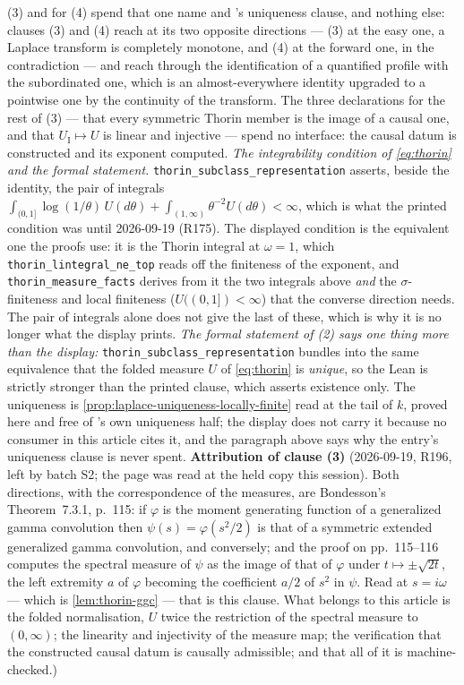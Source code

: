 \begin{proposition}
{(3) and for (4) spend that one name and 's uniqueness clause, and nothing else:
clauses (3) and (4) reach  at its two opposite directions --- (3) at the easy one, a
Laplace transform is completely monotone, and (4) at the forward one, in the contradiction ---
and reach  through the identification of a quantified profile with the subordinated
one, which is an almost-everywhere identity upgraded to a pointwise one by the continuity of the
transform. The three declarations for the rest of (3) --- that every symmetric Thorin member is
the image of a causal one, and that $U_{\mathrm I} \mapsto U$ is linear and injective --- spend
no interface: the causal datum is constructed and its exponent computed. \emph{The integrability
condition of \ref{eq:thorin} and the formal statement.} \texttt{thorin\_subclass\_representation}
asserts, beside the identity, the pair of integrals
$\int_{(0,1]}\log(1/\theta)\,U(d\theta) + \int_{(1,\infty)}\theta^{-2}U(d\theta) < \infty$, which
is what the printed condition was until 2026-09-19 (R175). The displayed condition is the
equivalent one the proofs use: it is the Thorin integral at $\omega = 1$, which
\texttt{thorin\_lintegral\_ne\_top} reads off the finiteness of the exponent, and
\texttt{thorin\_measure\_facts} derives from it the two integrals above \emph{and} the
$\sigma$-finiteness and local finiteness ($U((0,1]) < \infty$) that the converse direction
needs. The pair of integrals alone does not give the last of these, which is why it is no longer
what the display prints. \emph{The formal statement of (2) says one
thing more than the display:} \texttt{thorin\_subclass\_representation} bundles into the same
equivalence that the folded measure $U$ of \ref{eq:thorin} is \emph{unique}, so the Lean is
strictly stronger than the printed clause, which asserts existence only. The uniqueness is
\ref{prop:laplace-uniqueness-locally-finite} read at the tail of $k$, proved here and free of
's own uniqueness half; the display does not carry it because no consumer in this
article cites it, and the paragraph above says why the entry's uniqueness clause is never
spent.
\textbf{Attribution of clause (3)} (2026-09-19, R196, left by batch S2; the page was read at the
held copy this session). Both directions, with the correspondence of the measures, are
Bondesson's Theorem~7.3.1, p.~115: if $\varphi$ is the moment generating function of a
generalized gamma convolution then $\psi(s) = \varphi(s^2/2)$ is that of a symmetric extended
generalized gamma convolution, and conversely; and the proof on pp.~115--116 computes the
spectral measure of $\psi$ as the image of that of $\varphi$ under $t \mapsto \pm\sqrt{2t}$, the
left extremity $a$ of $\varphi$ becoming the coefficient $a/2$ of $s^2$ in $\psi$. Read at
$s = i\omega$ --- which is \ref{lem:thorin-ggc} --- that is this clause. What belongs to this
article is the folded normalisation, $U$ twice the restriction of the spectral measure to
$(0,\infty)$; the linearity and injectivity of the measure map; the verification that the
constructed causal datum is causally admissible; and that all of it is machine-checked.)}
\end{proposition}

